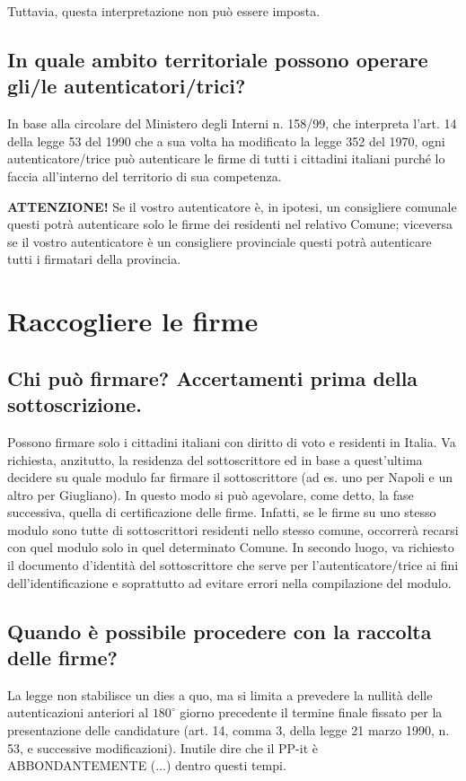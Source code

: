 \documentclass[paper=a4,11pt]{scrartcl}
\begin{document}
Tuttavia, questa interpretazione non può essere imposta.

\subsection{In quale ambito territoriale possono operare gli/le autenticatori/trici?}
In base alla circolare del Ministero degli Interni n. 158/99, che interpreta 
l'art. 14 della legge 53 del 1990 che a sua volta ha modificato la legge 352 
del 1970, ogni autenticatore/trice può autenticare le firme di tutti i 
cittadini italiani purché lo faccia all'interno del territorio di sua 
competenza.

\begin{leftbar}\textbf{ATTENZIONE!} Se il vostro autenticatore è, in ipotesi, un consigliere comunale 
questi potrà autenticare solo le firme dei residenti nel relativo Comune; 
viceversa se il vostro autenticatore è un consigliere provinciale questi potrà 
autenticare tutti i firmatari della provincia.\end{leftbar}

\section{Raccogliere le firme}
\subsection{Chi può firmare? Accertamenti prima della sottoscrizione.}
Possono firmare solo i cittadini italiani con diritto di voto e residenti in 
Italia. Va richiesta, anzitutto, la residenza del sottoscrittore ed in base a 
quest'ultima decidere su quale modulo far firmare il sottoscrittore (ad es. uno 
per Napoli e un altro per Giugliano). In questo modo si può agevolare, come 
detto, la fase successiva, quella di certificazione delle firme. Infatti, se le 
firme su uno stesso modulo sono tutte di sottoscrittori residenti nello stesso 
comune, occorrerà recarsi con quel modulo solo in quel determinato Comune. In 
secondo luogo, va richiesto il documento d’identità del sottoscrittore che 
serve per l’autenticatore/trice ai fini dell'identificazione e soprattutto ad 
evitare errori nella compilazione del modulo.

\subsection{Quando è possibile procedere con la raccolta delle firme?}
La legge non stabilisce un dies a quo, ma si limita a prevedere la nullità 
delle autenticazioni anteriori al $180^{\circ}$ giorno precedente il termine finale 
fissato per la presentazione delle candidature (art. 14, comma 3, della legge 
21 marzo 1990, n. 53, e successive modificazioni). Inutile dire che il PP-it è 
ABBONDANTEMENTE (...) dentro questi tempi.
\end{document}

